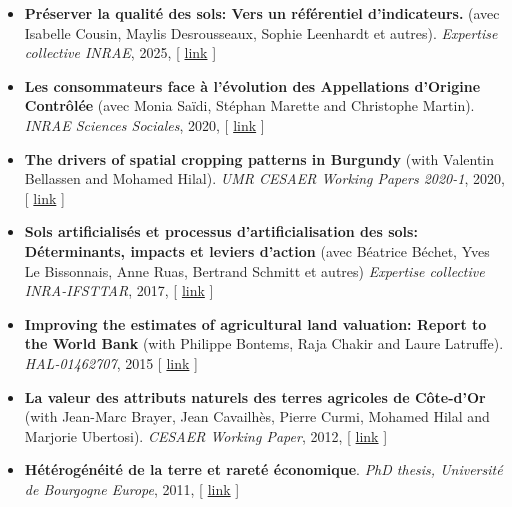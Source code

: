 \documentclass[12pt, a4paper]{./style}
\begin{document}
\begin{itemize}
\item \textbf{Préserver la qualité des sols: Vers un référentiel
d’indicateurs.} (avec Isabelle Cousin, Maylis
Desrousseaux, Sophie Leenhardt et autres). \emph{Expertise
collective INRAE}, 2025, [ \href{https://college-de-france.hal.science/hal-04934694/}{link} ]
\item \textbf{Les consommateurs face à l’évolution des Appellations
d’Origine Contrôlée} (avec Monia Saïdi, Stéphan Marette
and Christophe Martin). \emph{INRAE Sciences Sociales},
2020, [ \href{https://ageconsearch.umn.edu/record/305806}{link} ]
\item \textbf{The drivers of spatial cropping patterns in Burgundy}
(with Valentin Bellassen and Mohamed Hilal). \emph{UMR
CESAER Working Papers 2020-1}, 2020, [ \href{https://hal.inrae.fr/hal-02894116}{link} ]
\item \textbf{Sols artificialisés et processus d'artificialisation
des sols: Déterminants, impacts et leviers d'action}
(avec Béatrice Béchet, Yves Le Bissonnais, Anne Ruas,
Bertrand Schmitt et autres) \emph{Expertise collective
INRA-IFSTTAR}, 2017, [ \href{https://www.inrae.fr/actualites/sols-artificialises-processus-dartificialisation-sols}{link} ]
\item \textbf{Improving the estimates of agricultural land
valuation: Report to the World Bank} (with Philippe
Bontems, Raja Chakir and Laure
Latruffe). \emph{HAL-01462707}, 2015 [ \href{https://hal.archives-ouvertes.fr/hal-01462707}{link} ]
\item \textbf{La valeur des attributs naturels des terres agricoles
de Côte-d'Or} (with Jean-Marc Brayer, Jean Cavailhès,
Pierre Curmi, Mohamed Hilal and Marjorie
Ubertosi). \emph{CESAER Working Paper}, 2012, [ \href{http://ideas.repec.org/p/ceo/wpaper/33.html}{link} ]
\item \textbf{Hétérogénéité de la terre et rareté économique}. \emph{PhD
thesis, Université de Bourgogne Europe}, 2011, [ \href{http://tel.archives-ouvertes.fr/tel-00629142/en/}{link} ]
\end{itemize}
\label{sec:orgb2f5689}
\end{document}
